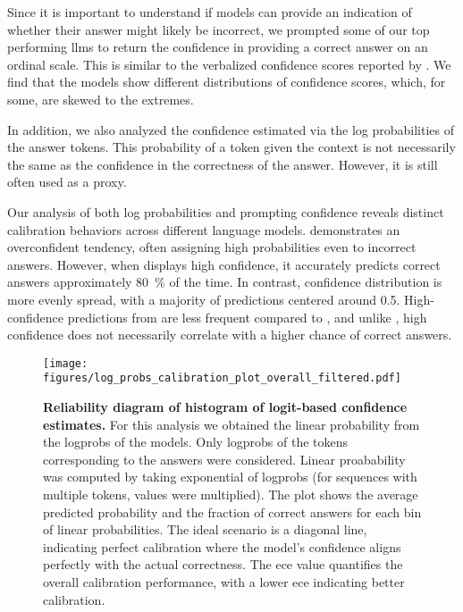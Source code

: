 Since it is important to understand if models can provide an indication of whether their answer might likely be incorrect, we prompted some of our top performing \glspl{llm} to return the confidence in providing a correct answer on an ordinal scale.
This is similar to the verbalized confidence scores reported by \textcite{xiong2023llms}.
We find that the models show different distributions of confidence scores, which, for some, are skewed to the extremes.

In addition, we also analyzed the confidence estimated via the log probabilities of the answer tokens. This probability of a token given the context is not necessarily the same as the confidence in the correctness of the answer. However, it is still often used as a proxy.

Our analysis of both log probabilities and prompting confidence reveals distinct calibration behaviors across different language models.
\GPTFourO demonstrates an overconfident tendency, often assigning high probabilities even to incorrect answers.
However, when \GPTFourO displays high confidence, it accurately predicts correct answers approximately \SI{80}{\percent} of the time. In contrast, \LlamaThreeOneEightBInstruct confidence distribution is more evenly spread, with a majority of predictions centered around 0.5. High-confidence predictions from \LlamaThreeOneEightBInstruct are less frequent compared to \GPTFourO, and unlike \GPTFourO, high confidence does not necessarily correlate with a higher chance of correct answers.

\begin{figure}[htb]
    \centering
    \texttt{[image: figures/log\_probs\_calibration\_plot\_overall\_filtered.pdf]}
    \caption{\textbf{Reliability diagram of histogram of logit-based confidence estimates.} For this analysis we obtained the linear probability from the logprobs of the models. Only logprobs of the tokens corresponding to the answers were considered. Linear proabability was computed by taking exponential of logprobs (for sequences with multiple tokens, values were multiplied).  The plot shows the average predicted probability and the fraction of correct answers for each bin of linear probabilities. The ideal scenario is a diagonal line, indicating perfect calibration where the model's confidence aligns perfectly with the actual correctness. The \gls{ece} value quantifies the overall calibration performance, with a lower \gls{ece} indicating better calibration.}
    \label{fig:confidence_score_distributions}
\end{figure}

